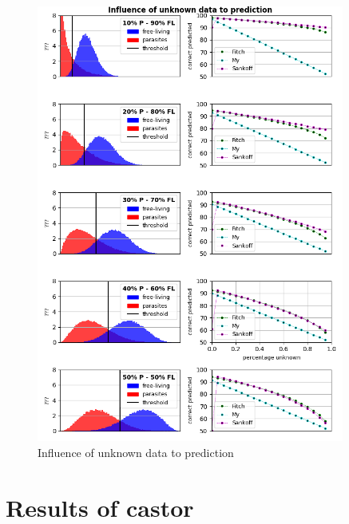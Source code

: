    \begin{figure}
      \caption{Influence of unknown data to prediction}
      \centering
      \includegraphics[trim = 0mm 0mm 0mm 50mm, clip,width=0.9\textwidth]{Figures/simulation_evaluation_1.png}
    \end{figure}

  \section{Results of castor}

